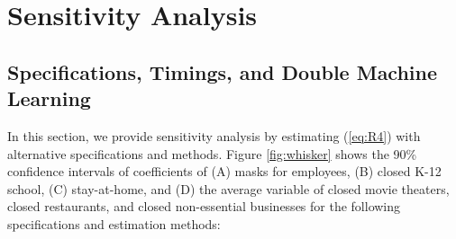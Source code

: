 \documentclass[11pt,reqno,letter]{amsart}
\theoremstyle{definition}
\begin{document}
\section{Sensitivity Analysis}\label{sec:sensitivity}

\subsection{Specifications, Timings, and Double Machine Learning}
In this section, we provide sensitivity analysis by estimating (\ref{eq:R4}) with alternative specifications and methods. Figure \ref{fig:whisker} shows  the 90\% confidence intervals of   coefficients of (A) masks for employees, (B)  closed K-12 school, (C) stay-at-home, and (D) the average variable of  closed movie theaters, closed restaurants, and closed non-essential businesses for the following specifications and estimation methods:
\end{document}
